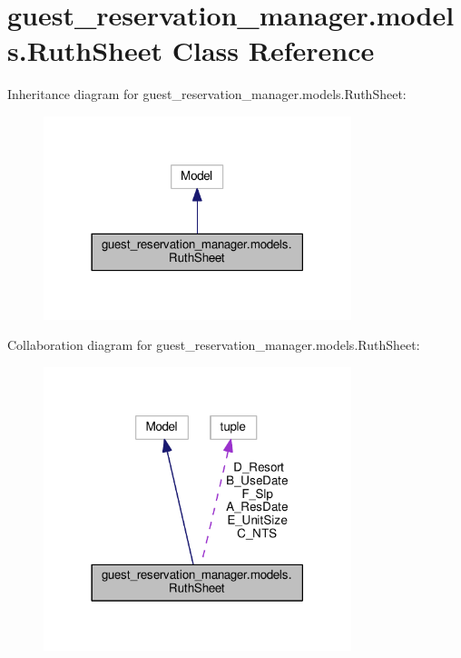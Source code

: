 \hypertarget{classguest__reservation__manager_1_1models_1_1RuthSheet}{\section{guest\-\_\-reservation\-\_\-manager.\-models.\-Ruth\-Sheet Class Reference}
\label{classguest__reservation__manager_1_1models_1_1RuthSheet}
}


Inheritance diagram for guest\-\_\-reservation\-\_\-manager.\-models.\-Ruth\-Sheet\-:
\nopagebreak
\begin{figure}[H]
\begin{center}
\leavevmode
\includegraphics[width=254pt]{classguest__reservation__manager_1_1models_1_1RuthSheet__inherit__graph}
\end{center}
\end{figure}


Collaboration diagram for guest\-\_\-reservation\-\_\-manager.\-models.\-Ruth\-Sheet\-:
\nopagebreak
\begin{figure}[H]
\begin{center}
\leavevmode
\includegraphics[width=254pt]{classguest__reservation__manager_1_1models_1_1RuthSheet__coll__graph}
\end{center}
\end{figure}
